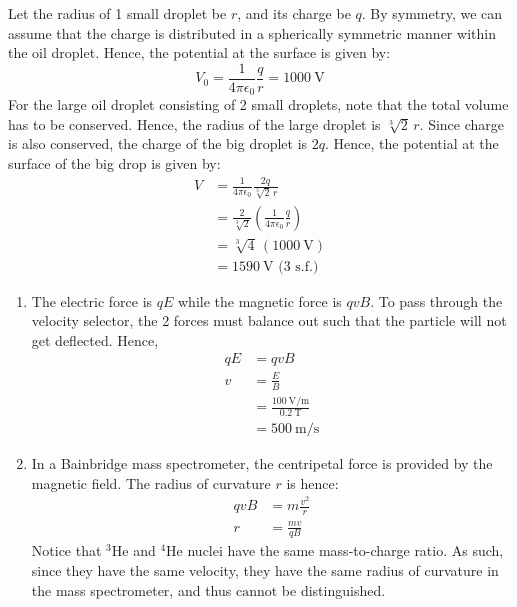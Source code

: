 \begin{solution}
    \begin{subsolution}
        Let the radius of 1 small droplet be $r$, and its charge be $q$. By symmetry, we can assume that the charge is distributed in a spherically symmetric manner within the oil droplet. Hence, the potential at the surface is given by:
        \[V_0=\frac{1}{4\pi\epsilon_0}\frac{q}{r}=\qty{1000}{\V}\]
        For the large oil droplet consisting of 2 small droplets, note that the total volume has to be conserved. Hence, the radius of the large droplet is \(\sqrt[3]{2}\,r\). Since charge is also conserved, the charge of the big droplet is \(2q\). Hence, the potential at the surface of the big drop is given by:
        \begin{align*}
            V&=\frac{1}{4\pi\epsilon_0}\frac{2q}{\sqrt[3]{2}\,r}\\
            &=\frac{2}{\sqrt[3]{2}}\left(\frac{1}{4\pi\epsilon_0}\frac{q}{r}\right)\\
            &=\sqrt[3]{4}\,(\qty{1000}{\V})\\
            &=\boxed{\qty{1590}{\V}}\text{ (3 s.f.)}
        \end{align*}
    \end{subsolution}
    
    \begin{subsolution}
        \renewcommand{\theenumi}{(\alph{enumi})}
        \begin{enumerate}
            \item The electric force is \(qE\) while the magnetic force is \(qvB\). To pass through the velocity selector, the 2 forces must balance out such that the particle will not get deflected. Hence,
            \begin{align*}
                qE&=qvB\\
                v&=\frac{E}{B}\\
                &=\frac{\qty{100}{\V\per\m}}{\qty{0.2}{\tesla}}\\
                &=\boxed{\qty{500}{\m\per\s}}
            \end{align*}
            \item In a Bainbridge mass spectrometer, the centripetal force is provided by the magnetic field. The radius of curvature $r$ is hence:
            \begin{align*}
                qvB&=m\frac{v^2}{r}\\
                r&=\frac{mv}{qB}
            \end{align*}
            Notice that ${}^{3}\mathrm{He}$ and ${}^{4}\mathrm{He}$ nuclei have the same mass-to-charge ratio. As such, since they have the same velocity, they have the same radius of curvature in the mass spectrometer, and thus $\boxed{\text{cannot}}$ be distinguished.
        \end{enumerate}
    \end{subsolution}
\end{solution}

